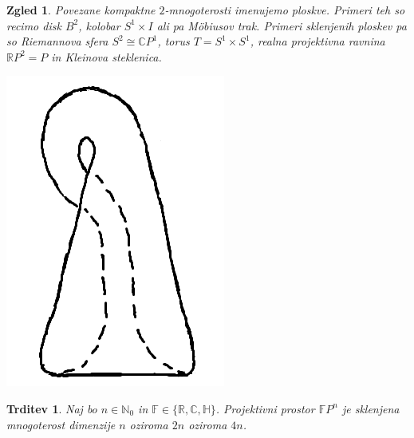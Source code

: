 \documentclass[10pt, a4paper]{article}
\newtheorem{trditev}[izr]{Trditev}
\newtheorem{zgled}{Zgled}[section]
\newcommand{\N}{\mathbb {N}}
\newcommand{\R}{\mathbb {R}}
\newcommand{\C}{\mathbb {C}}
\newcommand{\Ha}{\mathbb {H}}
\newcommand{\F}{\mathbb {F}}
\begin{document}
\begin{zgled}
    Povezane kompaktne $2$-mnogoterosti imenujemo ploskve.
    Primeri teh so recimo disk $B^2$, kolobar $S^1 \times I$ ali pa Möbiusov trak.  
    Primeri sklenjenih ploskev pa so Riemannova sfera $S^2 \cong \C P^1$, torus $T = S^1 \times S^1$,
    realna projektivna ravnina $\R P^2 = P$ in Kleinova steklenica.
    \begin{center}
      \includegraphics[scale=0.6]{zgled10.png}
    \end{center}
\end{zgled}

\begin{trditev}
  Naj bo $n \in \N_0$ in $\F \in \{\R, \C, \Ha\}$.
  Projektivni prostor $\F P^n$ je sklenjena mnogoterost dimenzije $n$ oziroma $2n$ oziroma $4n$.
\end{trditev}
\end{document}
